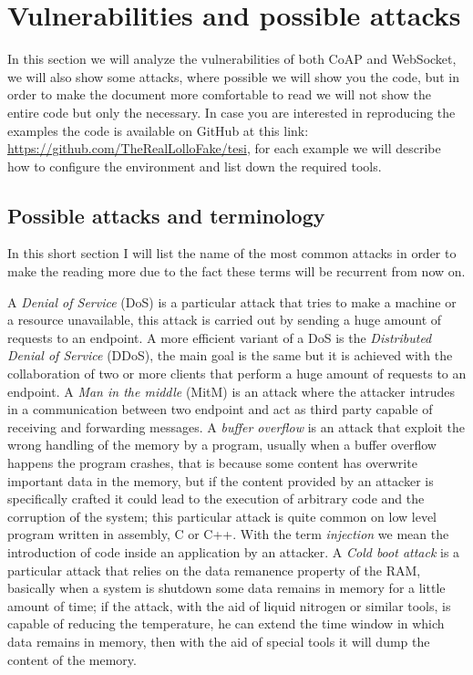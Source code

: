 	\section{Vulnerabilities and possible attacks}
	In this section we will analyze the vulnerabilities of both CoAP and WebSocket, we will also show some attacks,
	where possible we will show you the code, but in order to make the document more comfortable to read we will not
	show the entire code but only the necessary.\newline
	In case you are interested in reproducing the examples the code is available on GitHub at this link: \url{https://github.com/TheRealLolloFake/tesi}, for each example we will describe how to configure the environment
	and list down the required tools.\newline
	
	\subsection{Possible attacks and terminology}
	In this short section I will list the name of the most common attacks in order to make the reading more due to the fact these terms will be recurrent from now on.\newline
	
	A \emph{Denial of Service} (DoS) is a particular attack that tries to make a machine or a resource unavailable, this
	attack is carried out by sending a huge amount of requests to an endpoint.\newline
	A more efficient variant of a DoS is the \emph{Distributed Denial of Service} (DDoS), the main goal is the same but it is achieved
	with the collaboration of two or more clients that perform a huge amount of requests to an endpoint.\newline
	A \emph{Man in the middle} (MitM) is an attack where the attacker intrudes in a communication between two endpoint
	and act as third party capable of receiving and forwarding messages.\newline
	A \emph{buffer overflow} is an attack that exploit the wrong handling of the memory by a program, usually when a buffer
	overflow happens the program crashes, that is because some content has overwrite important data in the memory,
	but if the content provided by an attacker is specifically crafted it could lead to the execution of arbitrary code
	and the corruption of the system; this particular attack is quite common on low level program written in assembly, C or C++.\newline
	With the term \emph{injection} we mean the introduction of code inside an application by an attacker.\newline
	A \emph{Cold boot attack} is a particular attack that relies on the data remanence property of the RAM, basically when
	a system is shutdown some data remains in memory for a little amount of time; if the attack, with the aid of liquid nitrogen or similar tools, is capable of reducing the temperature, he can extend the time window in which data remains in memory, then with the aid of special tools it will dump the content of the memory.\newline
	

